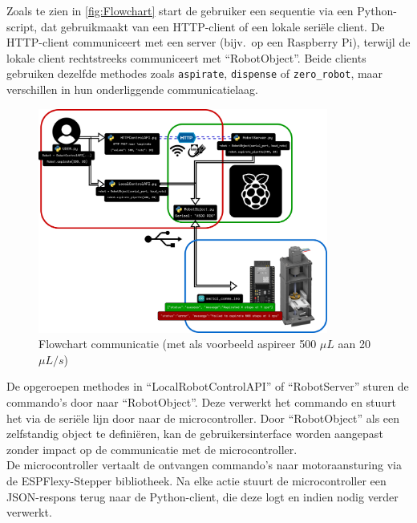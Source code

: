 Zoals te zien in \autoref{fig:Flowchart} start de gebruiker een sequentie via een Python-script, dat gebruikmaakt van een HTTP-client of een lokale seriële client. De HTTP-client communiceert met een server (bijv.\ op een Raspberry Pi), terwijl de lokale client rechtstreeks communiceert met ``RobotObject''. Beide clients gebruiken dezelfde methodes zoals \texttt{aspirate}, \texttt{dispense} of \texttt{zero\_robot}, maar verschillen in hun onderliggende communicatielaag.
\\[12pt]\begin{figure}[H]
    \centering
    \includegraphics[width=0.85\textwidth]{figures/Flowchart.png}
    \caption{Flowchart communicatie (met als voorbeeld aspireer 500 $\mu L$ aan 20 $\mu L/s$)}\label{fig:Flowchart}
\end{figure}
\vspace{0pt}
De opgeroepen methodes in ``LocalRobotControlAPI'' of ``RobotServer'' sturen de commando's door naar ``RobotObject''. Deze verwerkt het commando en stuurt het via de seriële lijn door naar de microcontroller. Door ``RobotObject'' als een zelfstandig object te definiëren, kan de gebruikersinterface worden aangepast zonder impact op de communicatie met de microcontroller.
\\[12pt]De microcontroller vertaalt de ontvangen commando’s naar motoraansturing via de ESPFlexy-Stepper bibliotheek. Na elke actie stuurt de microcontroller een JSON-respons terug naar de Python-client, die deze logt en indien nodig verder verwerkt.

